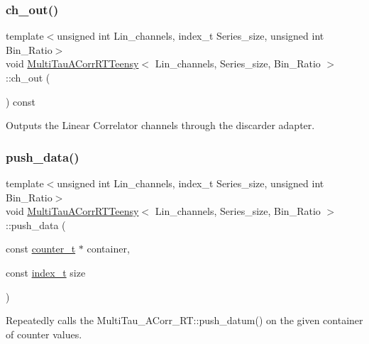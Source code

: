 \subsubsection{\texorpdfstring{ch\+\_\+out()}{ch\_out()}}
{\footnotesize\ttfamily template$<$unsigned int Lin\+\_\+channels, index\+\_\+t Series\+\_\+size, unsigned int Bin\+\_\+\+Ratio$>$ \\
void \hyperlink{classMultiTauACorrRTTeensy}{Multi\+Tau\+A\+Corr\+R\+T\+Teensy}$<$ Lin\+\_\+channels, Series\+\_\+size, Bin\+\_\+\+Ratio $>$\+::ch\+\_\+out (\begin{DoxyParamCaption}{ }\end{DoxyParamCaption}) const\hspace{0.3cm}{\ttfamily [inline]}}



Outputs the Linear Correlator channels through the discarder adapter. 

\mbox{\label{classMultiTauACorrRTTeensy_ad3c078b834bb1682c93ba4cd5639d450}} 
\subsubsection{\texorpdfstring{push\+\_\+data()}{push\_data()}}
{\footnotesize\ttfamily template$<$unsigned int Lin\+\_\+channels, index\+\_\+t Series\+\_\+size, unsigned int Bin\+\_\+\+Ratio$>$ \\
void \hyperlink{classMultiTauACorrRTTeensy}{Multi\+Tau\+A\+Corr\+R\+T\+Teensy}$<$ Lin\+\_\+channels, Series\+\_\+size, Bin\+\_\+\+Ratio $>$\+::push\+\_\+data (\begin{DoxyParamCaption}\item[{const \hyperlink{types_8hpp_a22f279793847eba127de149437848c48}{counter\+\_\+t} $\ast$}]{container,  }\item[{const \hyperlink{types_8hpp_a7c40bb931c31595ed6308605f4537447}{index\+\_\+t}}]{size }\end{DoxyParamCaption})\hspace{0.3cm}{\ttfamily [inline]}}



Repeatedly calls the Multi\+Tau\+\_\+\+A\+Corr\+\_\+\+R\+T\+::push\+\_\+datum() on the given container of counter values. 

